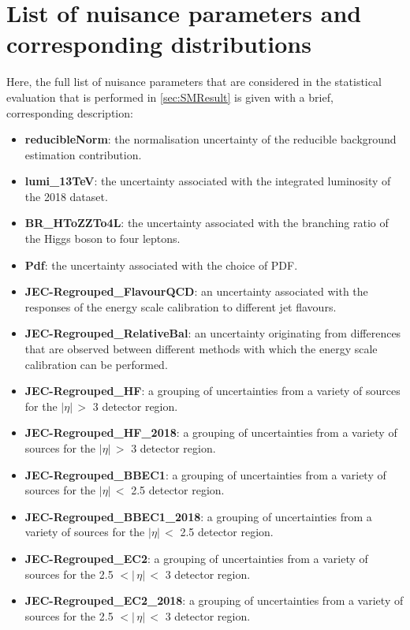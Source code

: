 \section{List of nuisance parameters and corresponding distributions}
\label{appendix:UncertaintiesSM}
Here, the full list of nuisance parameters that are considered in the statistical evaluation that is performed in \autoref{sec:SMResult} is given with a brief, corresponding description:
\begin{itemize}
    \item \textbf{reducibleNorm}: the normalisation uncertainty of the reducible background estimation contribution.
    \item \textbf{lumi\_13TeV}: the uncertainty associated with the integrated luminosity of the 2018 dataset.
    \item \textbf{BR\_HToZZTo4L}: the uncertainty associated with the branching ratio of the Higgs boson to four leptons.
    \item \textbf{Pdf}: the uncertainty associated with the choice of PDF.
    \item \textbf{JEC-Regrouped\_FlavourQCD}: an uncertainty associated with the responses of the energy scale calibration to different jet flavours.
    \item \textbf{JEC-Regrouped\_RelativeBal}: an uncertainty originating from differences that are observed between different methods with which the energy scale calibration can be performed. 
    \item \textbf{JEC-Regrouped\_HF}: a grouping of uncertainties from a variety of sources for the $\mid$$\eta$$\mid\,>$ 3 detector region.
    \item \textbf{JEC-Regrouped\_HF\_2018}:  a grouping of uncertainties from a variety of sources for the $\mid$$\eta$$\mid\,>$ 3 detector region.
    \item \textbf{JEC-Regrouped\_BBEC1}: a grouping of uncertainties from a variety of sources for the $\mid$$\eta$$\mid\,<$ 2.5 detector region.
    \item \textbf{JEC-Regrouped\_BBEC1\_2018}: a grouping of uncertainties from a variety of sources for the $\mid$$\eta$$\mid\,<$ 2.5 detector region.
    \item \textbf{JEC-Regrouped\_EC2}: a grouping of uncertainties from a variety of sources for the 2.5 $<\mid$$\,\eta$$\mid\,<$ 3 detector region.
    \item \textbf{JEC-Regrouped\_EC2\_2018}: a grouping of uncertainties from a variety of sources for the 2.5 $<\mid$$\,\eta$$\mid\,<$ 3 detector region.

\end{itemize}
